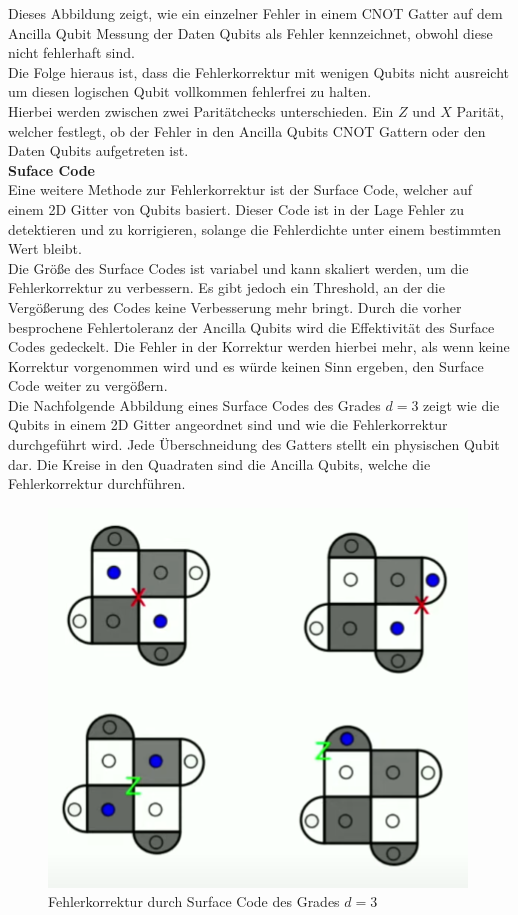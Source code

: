 Dieses Abbildung zeigt, wie ein einzelner Fehler in einem CNOT Gatter auf dem Ancilla Qubit Messung der Daten Qubits als Fehler kennzeichnet, obwohl diese nicht fehlerhaft sind.\\
Die Folge hieraus ist, dass die Fehlerkorrektur mit wenigen Qubits nicht ausreicht um diesen logischen Qubit vollkommen fehlerfrei zu halten.\\

Hierbei werden zwischen zwei Paritätchecks unterschieden. Ein $Z$ und $X$ Parität, welcher festlegt, ob der Fehler in den Ancilla Qubits CNOT Gattern oder den Daten Qubits aufgetreten ist.\\

\textbf{Suface Code}\\
Eine weitere Methode zur Fehlerkorrektur ist der Surface Code, welcher auf einem 2D Gitter von Qubits basiert.
Dieser Code ist in der Lage Fehler zu detektieren und zu korrigieren, solange die Fehlerdichte unter einem bestimmten Wert bleibt.\\

Die Größe des Surface Codes ist variabel und kann skaliert werden, um die Fehlerkorrektur zu verbessern.
Es gibt jedoch ein Threshold, an der die Vergößerung des Codes keine Verbesserung mehr bringt.
Durch die vorher besprochene Fehlertoleranz der Ancilla Qubits wird die Effektivität des Surface Codes gedeckelt.
Die Fehler in der Korrektur werden hierbei mehr, als wenn keine Korrektur vorgenommen wird und es würde keinen Sinn ergeben, den Surface Code weiter zu vergößern.\\

Die Nachfolgende Abbildung eines Surface Codes des Grades $d=3$ zeigt wie die Qubits in einem 2D Gitter angeordnet sind und wie die Fehlerkorrektur durchgeführt wird.
Jede Überschneidung des Gatters stellt ein physischen Qubit dar. Die Kreise in den Quadraten sind die Ancilla Qubits, welche die Fehlerkorrektur durchführen.\\

\begin{figure}[H]
    \centering
    \includegraphics[width=0.6\linewidth]{img/Errors.png}
    \caption{Fehlerkorrektur durch Surface Code des Grades $d=3$}
    \label{fig:Surface-Code}
\end{figure}

